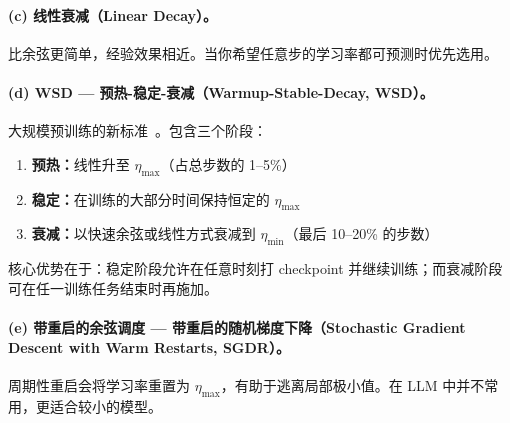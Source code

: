 \paragraph{(c) 线性衰减（Linear Decay）。}
\label{c-linear-decay.}

比余弦更简单，经验效果相近。当你希望任意步的学习率都可预测时优先选用。

\paragraph{(d) WSD --- 预热-稳定-衰减（Warmup-Stable-Decay, WSD）。}
\label{d-wsd-warmup-stable-decay.}

大规模预训练的新标准~\cite{hu2024minicpm, grattafiori2024llama3}。包含三个阶段：

\begin{enumerate}
  \item \textbf{预热：}线性升至 $\eta_{\max}$（占总步数的 1--5\%）
  \item \textbf{稳定：}在训练的大部分时间保持恒定的 $\eta_{\max}$
  \item \textbf{衰减：}以快速余弦或线性方式衰减到 $\eta_{\min}$（最后 10--20\% 的步数）
\end{enumerate}

核心优势在于：稳定阶段允许在任意时刻打 checkpoint 并继续训练；而衰减阶段可在任一训练任务结束时再施加。

\paragraph{(e) 带重启的余弦调度 --- 带重启的随机梯度下降（Stochastic Gradient Descent with Warm Restarts, SGDR）。}
\label{e-cosine-with-restarts-sgdr.}

周期性重启会将学习率重置为 $\eta_{\max}$，有助于逃离局部极小值。在 LLM 中并不常用，更适合较小的模型。

